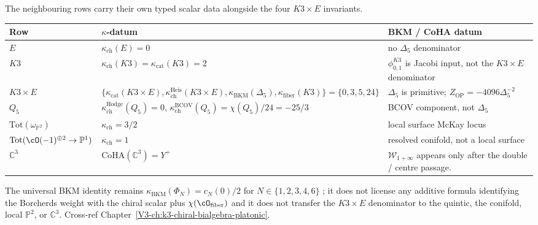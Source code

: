 \begin{remark}
\label{rem:landscape-2}
The neighbouring rows carry their own typed scalar data alongside the
four $K3\times E$ invariants.
\begin{center}
\renewcommand{\arraystretch}{1.25}
\begin{tabular}{p{}p{}p{}}
\textbf{Row} & \textbf{$\kappa$-datum} & \textbf{BKM / CoHA datum}\\
\hline
$E$ & $\kappa_{\mathrm{ch}}(E)=0$ & no $\Delta_5$ denominator\\
$K3$ & $\kappa_{\mathrm{ch}}(K3)=\kappa_{\mathrm{cat}}(K3)=2$
 & $\phi_{0,1}^{K3}$ is Jacobi input, not the $K3\times E$ denominator\\
$K3\times E$ &
$\{\kappa_{\mathrm{cat}}(K3\times E),
\kappa_{\mathrm{ch}}^{\mathrm{Heis}}(K3\times E),
\kappa_{\mathrm{BKM}}(\Delta_5),\kappa_{\mathrm{fiber}}(K3)\}
=\{0,3,5,24\}$ &
$\Delta_5$ is primitive;
$Z_{\mathrm{OP}}=-4096\Delta_5^{-2}$\\
$Q_5$ &
$\kappa_{\mathrm{ch}}^{\mathrm{Hodge}}(Q_5)=0$,
$\kappa_{\mathrm{ch}}^{\mathrm{BCOV}}(Q_5)=\chi(Q_5)/24=-25/3$ &
BCOV component, not $\Delta_5$\\
$\mathrm{Tot}(\omega_{\mathbb P^2})$ &
$\kappa_{\mathrm{ch}}=3/2$ &
local surface McKay locus\\
$\mathrm{Tot}(\cO(-1)^{\oplus2}\to\mathbb P^1)$ &
$\kappa_{\mathrm{ch}}=1$ &
resolved conifold, not a local surface\\
$\mathbb C^3$ &
$\mathrm{CoHA}(\mathbb C^3)=Y^+$ &
$\mathcal W_{1+\infty}$ appears only after the double / centre passage.
\end{tabular}
\end{center}
The universal BKM identity remains
$\kappa_{\mathrm{BKM}}(\Phi_N)=c_N(0)/2$ for
$N\in\{1,2,3,4,6\}$ \cite{Borcherds1998,Gritsenko1999}; it does not
license any additive formula identifying the Borcherds weight with the
chiral scalar plus $\chi(\cO_{\mathrm{fiber}})$
and it does not transfer the $K3\times E$ denominator to the quintic,
the conifold, local $\mathbb P^2$, or $\mathbb C^3$. Cross-ref
Chapter~\ref{V3-ch:k3-chiral-bialgebra-platonic}.
\end{remark}

